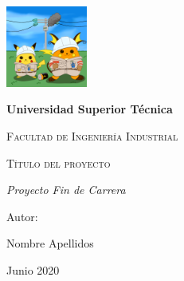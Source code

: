 \documentclass{report}
\begin{document}
    \begin{titlepage}
        \centering
        {\includegraphics[width=0.2\textwidth]{logo}\par}
        \vspace{1cm}
        {\bfseries\LARGE Universidad Superior T\'ecnica \par}
        \vspace{1cm}
        {\scshape\Large Facultad de Ingenier\'ia Industrial \par}
        \vspace{3cm}
        {\scshape\Huge T\'itulo del proyecto \par}
        \vspace{3cm}
        {\itshape\Large Proyecto Fin de Carrera \par}
        \vfill
        {\Large Autor: \par}
        {\Large Nombre Apellidos \par}
        \vfill
        {\Large Junio 2020 \par}
    \end{titlepage}
\end{document}
